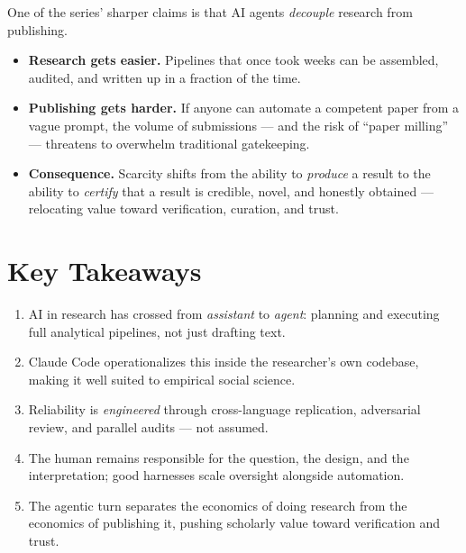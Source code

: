 \documentclass[11pt]{article}
\begin{document}
One of the series' sharper claims is that AI agents \emph{decouple} research
from publishing.

\begin{itemize}
  \item \textbf{Research gets easier.} Pipelines that once took weeks can be
        assembled, audited, and written up in a fraction of the time.
  \item \textbf{Publishing gets harder.} If anyone can automate a competent
        paper from a vague prompt, the volume of submissions --- and the risk of
        ``paper milling'' --- threatens to overwhelm traditional gatekeeping.
  \item \textbf{Consequence.} Scarcity shifts from the ability to \emph{produce}
        a result to the ability to \emph{certify} that a result is credible,
        novel, and honestly obtained --- relocating value toward verification,
        curation, and trust.
\end{itemize}

\section{Key Takeaways}

\begin{enumerate}
  \item AI in research has crossed from \emph{assistant} to \emph{agent}:
        planning and executing full analytical pipelines, not just drafting
        text.
  \item Claude Code operationalizes this inside the researcher's own codebase,
        making it well suited to empirical social science.
  \item Reliability is \emph{engineered} through cross-language replication,
        adversarial review, and parallel audits --- not assumed.
  \item The human remains responsible for the question, the design, and the
        interpretation; good harnesses scale oversight alongside automation.
  \item The agentic turn separates the economics of doing research from the
        economics of publishing it, pushing scholarly value toward
        verification and trust.
\end{enumerate}

\end{document}
